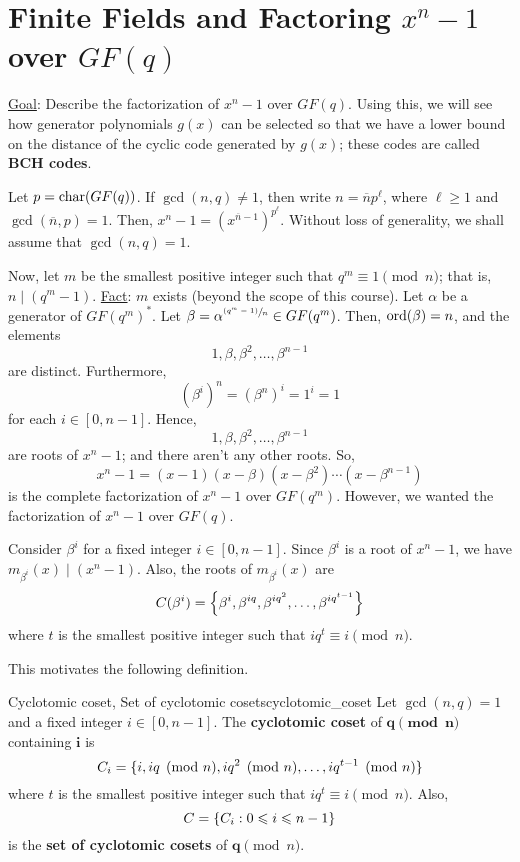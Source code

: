 \section{Finite Fields and Factoring \texorpdfstring{$ x^n-1 $}{xⁿ-1}
  over \texorpdfstring{$ GF(q) $}{GF(q)}}
\underline{Goal}: Describe the factorization of
$ x^n-1 $ over $ GF(q) $. Using this, we will see how
generator polynomials $ g(x) $ can be selected so that we have a
lower bound on the distance of the cyclic code
generated by $ g(x) $; these codes are called \textbf{BCH codes}.

Let $ p=\ch(GF(q)) $. If $ \gcd(n,q)\neq 1 $, then
write $ n=\overline{n}p^\ell $, where $ \ell\geqslant 1 $
and $ \gcd(\overline{n},p)=1 $. Then, $ x^n-1=(x^{\overline{n}-1})^{p^\ell} $.
Without loss of generality, we shall assume that $ \gcd(n,q)=1 $.

Now, let $ m $ be the smallest positive integer such that
$ q^m\equiv 1\pmod{n} $; that is, $ n\mid (q^m-1) $.
\underline{Fact}: $ m $ exists (beyond the scope of this course).
Let $ \alpha $ be a generator of $ GF(q^m)^* $.
Let $ \beta=\alpha^{\sfrac{(q^m-1)}{n}} \in GF(q^m) $.
Then, $ \ord(\beta)=n $, and the elements
\[ 1,\beta,\beta^2,\ldots ,\beta^{n-1} \]
are distinct. Furthermore,
\[ (\beta^i)^n=(\beta^n)^i=1^i=1 \]
for each $ i\in[0,n-1] $. Hence,
\[ 1,\beta,\beta^2,\ldots ,\beta^{n-1} \]
are roots of $ x^n-1 $; and there aren't any other roots. So,
\[ x^n-1=(x-1)(x-\beta)(x-\beta^2)\cdots(x-\beta^{n-1}) \]
is the complete factorization of $ x^n-1 $ over $ GF(q^m) $.
However, we wanted the factorization of $ x^n-1 $ over $ GF(q) $.

Consider $ \beta^i $ for a fixed integer $ i\in[0,n-1] $. Since
$ \beta^i $ is a root of $ x^n-1 $, we have $ m_{\beta^i}(x)\mid (x^n-1) $.
Also, the roots of $ m_{\beta^i}(x) $ are
\[ C(\beta^i)=\set*{\beta^i,\beta^{iq},\beta^{iq^2},\ldots ,\beta^{iq^{t-1}}} \]
where $ t $ is the smallest positive integer such that $ iq^t\equiv i\pmod{n} $.

This motivates the following definition.

\begin{Definition}{Cyclotomic coset, Set of cyclotomic cosets}{cyclotomic_coset}
    Let $ \gcd(n,q)=1 $ and a fixed integer $ i\in[0,n-1] $. The
    \textbf{cyclotomic coset} of $\bm{q\pmod{n}}$
    containing $\bm{i}$ is
    \[ C_i=\set{i,iq\pmod{n},iq^2\pmod{n},\ldots ,iq^{t-1}\pmod{n}} \]
    where $ t $ is the smallest positive integer such that $ iq^t\equiv i\pmod{n} $.
    Also,
    \[ C=\set{C_i:0\leqslant i\leqslant n-1} \]
    is the \textbf{set of cyclotomic cosets} of $\bm{q}\pmod{n}$.
\end{Definition}



